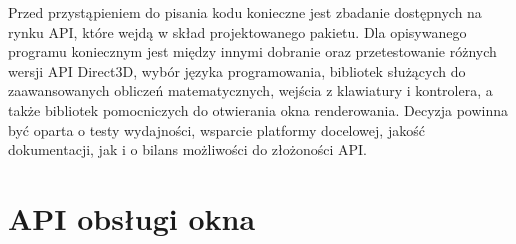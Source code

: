 


Przed przystąpieniem do pisania kodu konieczne jest zbadanie dostępnych
na rynku API, które wejdą w skład projektowanego pakietu. Dla
opisywanego programu koniecznym jest między innymi dobranie oraz
przetestowanie różnych wersji API Direct3D, wybór języka programowania,
bibliotek służących do zaawansowanych obliczeń matematycznych, wejścia z
klawiatury i kontrolera, a także bibliotek pomocniczych do otwierania
okna renderowania. Decyzja powinna być oparta o testy wydajności,
wsparcie platformy docelowej, jakość dokumentacji, jak i o bilans
możliwości do złożoności API.

\section{API obsługi okna}

